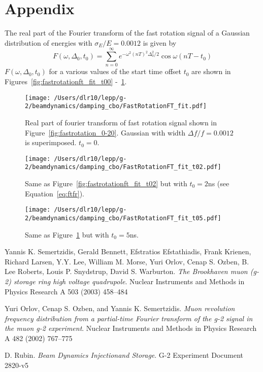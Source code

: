 \documentclass[10pt]{report}
\begin{document}
\section*{Appendix}
The real part of the Fourier transform of the fast rotation signal of a Gaussian distribution of energies with $\sigma_E/E = 0.0012$ is given by
\begin{equation}
F(\omega, \Delta_0,t_0)=\sum_{n=0}^\infty e^{-\omega^2(nT)^2\Delta_0^2/2}\cos\omega(nT-t_0)\label{eq:ftfr}
\end{equation}
$F(\omega,\Delta_0,t_0)$ for a various values of the start time offset $t_0$ are shown in Figures~\ref{fig:fastrotationft_fit_t00} -~\ref{fig:fastrotationft_fit_t05}.
\begin{figure}[htbp] %
\begin{minipage}[t]{0.32\textwidth}
   \centering
   \texttt{[image: /Users/dlr10/lepp/g-2/beamdynamics/damping\_cbo/FastRotationFT\_fit.pdf]} 
   \caption{Real part of fourier transform of fast rotation signal shown in Figure~\ref{fig:fastrotation_0-20}. Gaussian with width $\Delta f/f=0.0012$ 
is superimposed. $t_0=0$. \label{fig:fastrotationft_fit_t00}}
 \end{minipage}
\hfill
\begin{minipage}[t]{0.32\textwidth}
\centering
   \texttt{[image: /Users/dlr10/lepp/g-2/beamdynamics/damping\_cbo/FastRotationFT\_fit\_t02.pdf]} 
\caption{Same as Figure~\ref{fig:fastrotationft_fit_t02} but with $t_0=2$ns (see Equation~\ref{eq:ftfr}).
   \label{fig:fastrotationft_fit_t02}}
\end{minipage}
\hfill
\begin{minipage}[t]{0.32\textwidth}
\centering
   \texttt{[image: /Users/dlr10/lepp/g-2/beamdynamics/damping\_cbo/FastRotationFT\_fit\_t05.pdf]} 
\caption{Same as Figure~\ref{fig:fastrotationft_fit_t05} but with $t_0=5$ns.
   \label{fig:fastrotationft_fit_t05}}
\end{minipage}
\end{figure}



\begin{thebibliography}{9}

Yannis K. Semertzidis, Gerald Bennett, Efstratios Efstathiadis, Frank Krienen, Richard Larsen, Y.Y. Lee, William M. Morse, 
Yuri Orlov, Cenap S. Ozben, B. Lee Roberts, Louis P. Snydstrup, David S. Warburton.
\textit{The Brookhaven muon (g-2) storage ring high voltage quadrupole}.
Nuclear Instruments and Methods in Physics Research A 503 (2003) 458–484


Yuri Orlov, Cenap S. Ozben, and Yannis K. Semertzidis.
\textit{Muon revolution frequency distribution from a partial-time Fourier transform of the g-2 signal in the muon g-2 experiment}.
Nuclear Instruments and Methods in Physics Research A 482 (2002) 767–775

D. Rubin. \textit{Beam Dynamics Injectionand Storage}. G-2 Experiment Document 2820-v5
\end{thebibliography}
\end{document}
